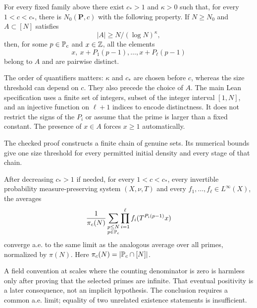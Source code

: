 \begin{theorem}\label{t:szemeredi}
\leanok
For every fixed family above there exist $c_*>1$ and $\kappa>0$ such that, for every $1<c<c_*$, there is $N_0(\mathbf P,c)$ with the following property. If $N\geq N_0$ and $A\subset[N]$ satisfies
\[
 |A|\geq N/(\log N)^\kappa,
\]
then, for some $p\in\mathbb P_c$ and $x\in\mathbb Z$, all the elements
\[
 x,\ x+P_1(p-1),\ldots,x+P_\ell(p-1)
\]
belong to $A$ and are pairwise distinct.
\end{theorem}
\ifDetailed
The order of quantifiers matters: $\kappa$ and $c_*$ are chosen before $c$, whereas the size threshold can depend on $c$. They also precede the choice of $A$. The main Lean specification uses a finite set of integers, subset of the integer interval $[1,N]$, and an injective function on $\ell+1$ indices to encode distinctness. It does not restrict the signs of the $P_i$ or assume that the prime is larger than a fixed constant. The presence of $x\in A$ forces $x\geq1$ automatically.

The checked proof constructs a finite chain of genuine sets. Its numerical bounds give one size threshold for every permitted initial density and every stage of that chain.
\fi

\begin{theorem}\label{t:pointwise}
\leanok
After decreasing $c_*>1$ if needed, for every $1<c<c_*$, every invertible probability measure-preserving system $(X,\nu,T)$ and every $f_1,\ldots,f_\ell\in L^\infty(X)$, the averages
\[
 \frac1{\pi_c(N)}\sum_{\substack{p\leq N\\p\in\mathbb P_c}}
 \prod_{i=1}^{\ell}f_i(T^{P_i(p-1)}x)
\]
converge a.e. to the same limit as the analogous average over all primes, normalized by $\pi(N)$. Here $\pi_c(N)=|\mathbb P_c\cap[N]|$.
\end{theorem}
\ifDetailed
A field convention at scales where the counting denominator is zero is harmless only after proving that the selected primes are infinite. That eventual positivity is a later consequence, not an implicit hypothesis. The conclusion requires a common a.e. limit; equality of two unrelated existence statements is insufficient.

